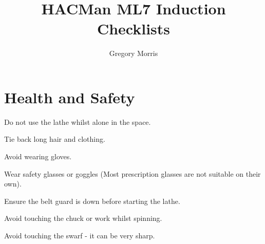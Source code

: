 \documentclass[11pt,a5paper,twoside,openany]{book}
\title{\textbf{HACMan ML7 Induction Checklists}}
\author{Gregory Morris}
\date{}
\newenvironment{checklist}{
  \begin{list}{}{}
  
}{%
  \end{list}
}
\begin{document}
\maketitle
\chapter{Health and Safety}
\begin{checklist}
\item Do not use the lathe whilst alone in the space.
\item Tie back long hair and clothing.
\item Avoid wearing gloves.
\item Wear safety glasses or goggles (Most prescription glasses are not suitable on their own).
\item Ensure the belt guard is down before starting the lathe.
\item Avoid touching the chuck or work whilst spinning.
\item Avoid touching the swarf - it can be very sharp.
\end{checklist}
\end{document}
